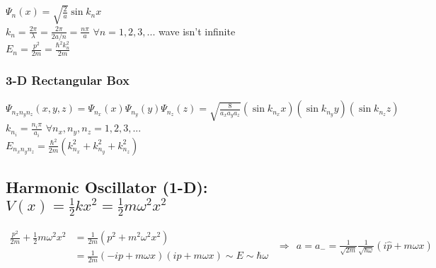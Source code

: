 \documentclass[12pt]{article}
\begin{document}
\vspace{15pt}\noindent
\( \displaystyle \Psi_n(x) = \sqrt{\frac{2}{a}} \sin{k_nx} \) \\[20pt]
\( \displaystyle k_n = \frac{2 \pi}{\lambda} = \frac{2 \pi}{2a/n} = \frac{n \pi}{a}\)
    \hspace{18pt} \( \forall n=1, 2, 3, ...\)         
    \hspace{18pt} \hspace{18pt}  
    \hspace{18pt} {\scriptsize wave isn't infinite} \\[20pt]
\( \displaystyle E_n = \frac{p^2}{2m} = \frac{\hbar^2 k_n^2}{2m}\)

\vspace{15pt}
\subsubsection{3-D Rectangular Box}
\( \displaystyle \Psi_{n_x n_y n_z}(x,y,z) = \Psi_{n_x}(x) \Psi_{n_y}(y) \Psi_{n_z}(z) 
    = \sqrt{\frac{8}{a_x a_y a_z}} (\sin{k_{n_x} x}) (\sin{k_{n_y} y}) (\sin{k_{n_z} z}) \) \\[20pt]
\( \displaystyle k_{n_i} = \frac{n_i \pi}{a_i}\)
    \hspace{18pt} \( \forall n_x, n_y, n_z = 1, 2, 3, ...\) \\[20pt]
\( \displaystyle E_{n_x n_y n_z} = \frac{\hbar^2}{2m} (k_{n_x}^2 + k_{n_y}^2 + k_{n_z}^2) \) 

%
%
\newpage
\subsection{Harmonic Oscillator (1-D):\ \ \boldmath\( V(x) = \frac{1}{2} k x^2 = \frac{1}{2} m \omega^2 x^2 \)\unboldmath}

\vspace{5pt}\noindent
\( 
    \begin{aligned}
        \tfrac{p^2}{2m} + \tfrac{1}{2} m \omega^2 x^2 & = \tfrac{1}{2m} \left( p^2 + m^2 \omega^2 x^2 \right)\\
        & = \tfrac{1}{2m} \left( -ip + m \omega x \right) \left( i p + m \omega x \right) 
            \sim E \sim \hbar \omega 
    \end{aligned}
    \ \ \Rightarrow \ \
    \boxed{ a = a_{-} = \tfrac{1}{\sqrt{2 m}} \tfrac{1}{\sqrt{\hbar \omega}} \left( i\hat{p} + m \omega x \right) }    
\)
\end{document}
